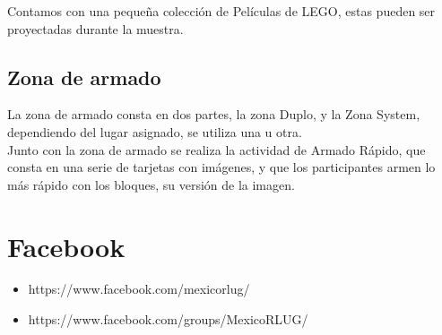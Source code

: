 \documentclass[]{article}
\begin{document}
Contamos con una pequeña colección de Películas de LEGO, estas pueden ser proyectadas durante la muestra.


\subsection{Zona de armado}

La zona de armado consta en dos partes, la zona Duplo, y la Zona System, dependiendo del lugar asignado, se utiliza una u otra.\\

Junto con la zona de armado se realiza la actividad de Armado Rápido, que consta en una serie de tarjetas con imágenes, y que los participantes armen lo más rápido con los bloques, su versión de la imagen.\\


\section{Facebook}

\begin{itemize}
\item	 https://www.facebook.com/mexicorlug/
\item	 https://www.facebook.com/groups/MexicoRLUG/ 
\end{itemize}


%
%
%
		
\end{document}
